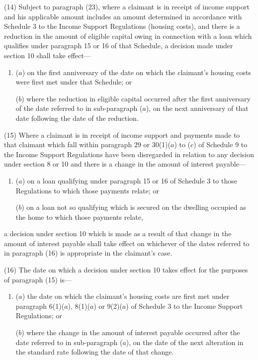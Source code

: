 \documentclass[12pt,a4paper]{article}
\begin{document}
(14) Subject to paragraph (23), where a claimant is in receipt of income support and his applicable amount includes an amount determined in accordance with Schedule 3 to the Income Support Regulations (housing costs), and there is a reduction in the amount of eligible capital owing in connection with a loan which qualifies under paragraph 15 or 16 of that Schedule, a decision made under section 10 shall take effect—
\begin{enumerate}\item[]
($a$) on the first anniversary of the date on which the claimant’s housing costs were first met under that Schedule; or

($b$) where the reduction in eligible capital occurred after the first anniversary of the date referred to in sub-paragraph ($a$), on the next anniversary of that date following the date of the reduction.
\end{enumerate}

(15) Where a claimant is in receipt of income support and payments made to that claimant which fall within paragraph 29 or 30(1)($a$) to ($c$) of Schedule 9 to the Income Support Regulations have been disregarded in relation to any decision under section 8 or 10 and there is a change in the amount of interest payable—
\begin{enumerate}\item[]
($a$) on a loan qualifying under paragraph 15 or 16 of Schedule 3 to those Regulations to which those payments relate; or

($b$) on a loan not so qualifying which is secured on the dwelling occupied as the home to which those payments relate,
\end{enumerate}
a decision under section 10 which is made as a result of that change in the amount of interest payable shall take effect on whichever of the dates referred to in paragraph (16) is appropriate in the claimant’s case.

(16) The date on which a decision under section 10 takes effect for the purposes of paragraph (15) is—
\begin{enumerate}\item[]
($a$) the date on which the claimant’s housing costs are first met under paragraph 6(1)($a$), 8(1)($a$) or 9(2)($a$) of Schedule 3 to the Income Support Regulations; or

($b$) where the change in the amount of interest payable occurred after the date referred to in sub-paragraph ($a$), on the date of the next alteration in the standard rate following the date of that change.
\end{enumerate}
\end{document}
